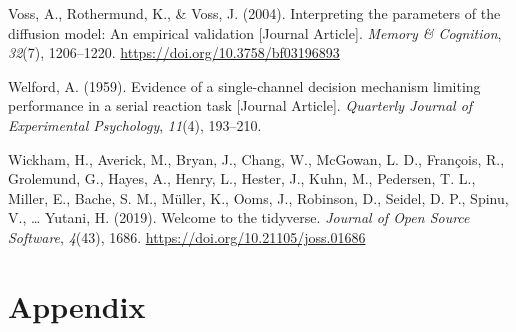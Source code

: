 \documentclass[
  man,floatsintext]{apa7}
\newlength{\cslhangindent}
\newlength{\cslentryspacingunit} %
\newenvironment{CSLReferences}[2] %
 {%
  \setlength{\parindent}{0pt}
  \ifodd #1
  \let\oldpar\par
  \def\par{\hangindent=\cslhangindent\oldpar}
  \fi
  \setlength{\parskip}{#2\cslentryspacingunit}
 }%
 {}
\begin{document}
\begin{CSLReferences}{1}{0}
\leavevmode{}%
Voss, A., Rothermund, K., \& Voss, J. (2004). Interpreting the parameters of the diffusion model: An empirical validation {[}Journal Article{]}. \emph{Memory \& Cognition}, \emph{32}(7), 1206--1220. \url{https://doi.org/10.3758/bf03196893}

\leavevmode{}%
Welford, A. (1959). Evidence of a single-channel decision mechanism limiting performance in a serial reaction task {[}Journal Article{]}. \emph{Quarterly Journal of Experimental Psychology}, \emph{11}(4), 193--210.

\leavevmode{}%
Wickham, H., Averick, M., Bryan, J., Chang, W., McGowan, L. D., François, R., Grolemund, G., Hayes, A., Henry, L., Hester, J., Kuhn, M., Pedersen, T. L., Miller, E., Bache, S. M., Müller, K., Ooms, J., Robinson, D., Seidel, D. P., Spinu, V., \ldots{} Yutani, H. (2019). Welcome to the {tidyverse}. \emph{Journal of Open Source Software}, \emph{4}(43), 1686. \url{https://doi.org/10.21105/joss.01686}

\end{CSLReferences}

\newpage

\hypertarget{appendix}{%
\section{Appendix}\label{appendix}}
\end{document}
